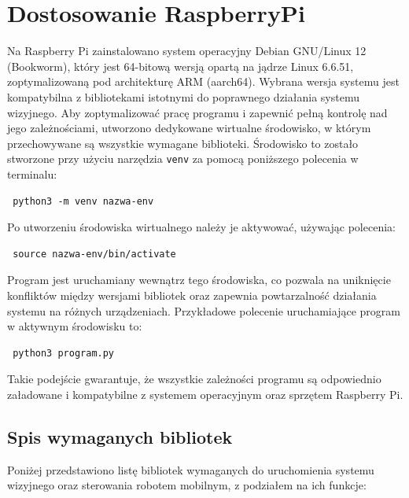 \documentclass[a4paper,twoside,12pt]{book}
\begin{document}
\newpage

\section{Dostosowanie RaspberryPi}
Na Raspberry Pi zainstalowano system operacyjny Debian GNU/Linux 12 (Bookworm), który jest 64-bitową wersją opartą na jądrze Linux 6.6.51, zoptymalizowaną pod architekturę ARM (aarch64). Wybrana wersja systemu jest kompatybilna z bibliotekami istotnymi do poprawnego działania systemu wizyjnego. Aby zoptymalizować pracę programu i zapewnić pełną kontrolę nad jego zależnościami, utworzono dedykowane wirtualne środowisko, w którym przechowywane są wszystkie wymagane biblioteki. Środowisko to zostało stworzone przy użyciu narzędzia \texttt{venv} za pomocą poniższego polecenia w terminalu: \begin{verbatim} python3 -m venv nazwa-env \end{verbatim} Po utworzeniu środowiska wirtualnego należy je aktywować, używając polecenia: \begin{verbatim} source nazwa-env/bin/activate \end{verbatim} Program jest uruchamiany wewnątrz tego środowiska, co pozwala na uniknięcie konfliktów między wersjami bibliotek oraz zapewnia powtarzalność działania systemu na różnych urządzeniach. Przykładowe polecenie uruchamiające program w aktywnym środowisku to: \begin{verbatim} python3 program.py \end{verbatim} Takie podejście gwarantuje, że wszystkie zależności programu są odpowiednio załadowane i kompatybilne z systemem operacyjnym oraz sprzętem Raspberry Pi.
\newpage
\subsection{Spis wymaganych bibliotek}
Poniżej przedstawiono listę bibliotek wymaganych do uruchomienia systemu wizyjnego oraz sterowania robotem mobilnym, z podziałem na ich funkcje:
\end{document}
